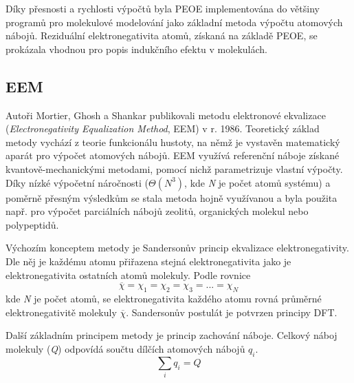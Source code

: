 Díky přesnosti a rychlosti výpočtů byla PEOE implementována do většiny programů pro molekulové modelování jako základní metoda výpočtu atomových nábojů. Reziduální elektronegativita atomů, získaná na základě PEOE, se prokázala vhodnou pro popis indukčního efektu v molekulách. 

\subsection{EEM}
Autoři Mortier, Ghosh a Shankar publikovali metodu elektronové ekvalizace (\textit{Electronegativity Equalization Method}, EEM) v r. 1986. Teoretický základ metody vychází z teorie funkcionálu hustoty, na němž je vystavěn matematický aparát pro výpočet atomových nábojů. EEM využívá referenční náboje získané kvantově-mechanickými metodami, pomocí nichž parametrizuje vlastní výpočty. Díky nízké výpočetní náročnosti ($\Theta(N^3)$, kde \textit{N} je počet atomů systému) a poměrně přesným výsledkům se stala metoda hojně využívanou a byla použita např. pro výpočet parciálních nábojů zeolitů, organických molekul nebo polypeptidů.

Výchozím konceptem metody je Sandersonův princip ekvalizace elektronegativity. Dle něj je každému atomu přiřazena stejná elektronegativita jako je elektronegativita ostatních atomů molekuly. Podle rovnice 
\begin{equation}
\label{Sanders}
    \overline{\chi} = \chi_1 = \chi_2 = \chi_3 = ... = \chi_N
\end{equation}
kde \textit{N} je počet atomů, se elektronegativita každého atomu rovná průměrné elektronegativitě molekuly $\overline{\chi}$. Sandersonův postulát je potvrzen principy DFT. %

Další základním principem metody je princip zachování náboje. Celkový náboj molekuly (\textit{Q}) odpovídá součtu dílčích atomových nábojů $q_i$.
\begin{equation}
\label{EEM_chargesum}
    \sum_{i} q_i = Q
\end{equation}

